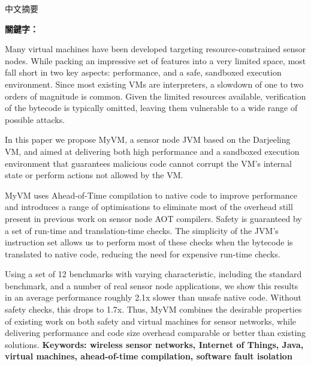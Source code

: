 \begin{abstractzh}
中文摘要

\bigbreak
\noindent \textbf{關鍵字：}{\, \makeatletter \@keywordszh \makeatother}
\end{abstractzh}

\begin{abstracten}
Many virtual machines have been developed targeting resource-constrained sensor nodes. While packing an impressive set of features into a very limited space, most fall short in two key aspects: performance, and a safe, sandboxed execution environment. Since most existing VMs are interpreters, a slowdown of one to two orders of magnitude is common. Given the limited resources available, verification of the bytecode is typically omitted, leaving them vulnerable to a wide range of possible attacks.

In this paper we propose MyVM, a sensor node JVM based on the Darjeeling VM, and aimed at delivering both high performance and a sandboxed execution environment that guarantees malicious code cannot corrupt the VM's internal state or perform actions not allowed by the VM.

MyVM uses Ahead-of-Time compilation to native code to improve performance and introduces a range of optimisations to eliminate most of the overhead still present in previous work on sensor node AOT compilers. Safety is guaranteed by a set of run-time and translation-time checks. The simplicity of the JVM's instruction set allows us to perform most of these checks when the bytecode is translated to native code, reducing the need for expensive run-time checks.

Using a set of 12 benchmarks with varying characteristic, including the standard  benchmark, and a number of real sensor node applications, we show this results in an average performance roughly 2.1x slower than unsafe native code. Without safety checks, this drops to 1.7x. Thus, MyVM combines the desirable properties of existing work on both safety and virtual machines for sensor networks, while delivering performance and code size overhead comparable or better than existing solutions.
\bigbreak
\noindent \textbf{Keywords: wireless sensor networks, Internet of Things, Java, virtual machines, ahead-of-time compilation, software fault isolation}{\, \makeatletter \@keywordsen \makeatother}
\end{abstracten}

\begin{comment}


\end{comment}

